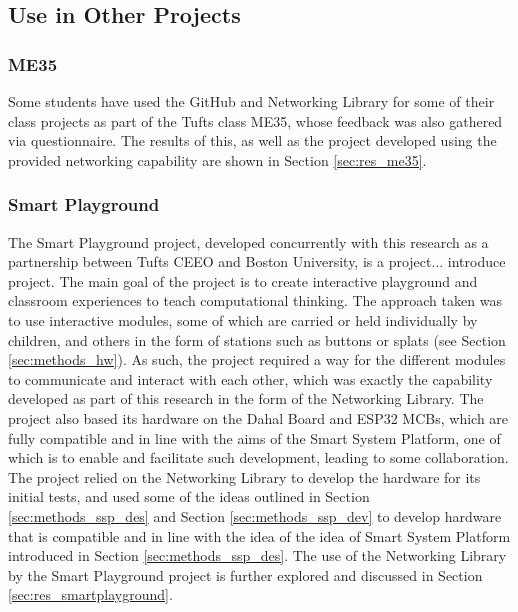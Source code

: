 \subsection{\label{sec:methods_other}Use in Other Projects}

\subsubsection{\label{sec:methods_me35}ME35}
Some students have used the GitHub and Networking Library for some of their class projects as part of the Tufts class ME35, whose feedback was also gathered via questionnaire. The results of this, as well as the project developed using the provided networking capability are shown in Section \ref{sec:res_me35}.

\subsubsection{\label{sec:methods_smart_playground}Smart Playground}
The Smart Playground project, developed concurrently with this research as a partnership between Tufts CEEO and Boston University, is a project... introduce project. 
The main goal of the project is to create interactive playground and classroom experiences to teach computational thinking. The approach taken was to use interactive modules, some of which are carried or held individually by children, and others in the form of stations such as buttons or splats (see Section \ref{sec:methods_hw}). As such, the project required a way for the different modules to communicate and interact with each other, which was exactly the capability developed as part of this research in the form of the Networking Library. The project also based its hardware on the Dahal Board and ESP32 MCBs, which are fully compatible and in line with the aims of the Smart System Platform, one of which is to enable and facilitate such development, leading to some collaboration. The project relied on the Networking Library to develop the hardware for its initial tests, and used some of the ideas outlined in Section \ref{sec:methods_ssp_des} and Section \ref{sec:methods_ssp_dev} to develop hardware that is compatible and in line with the idea of the idea of Smart System Platform introduced in Section \ref{sec:methods_ssp_des}. The use of the Networking Library by the Smart Playground project is further explored and discussed in Section \ref{sec:res_smartplayground}.



